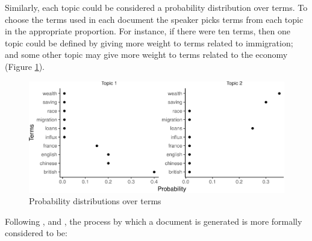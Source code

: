 \documentclass[12pt,]{article}
\theoremstyle{definition}
\theoremstyle{definition}
\theoremstyle{definition}
\theoremstyle{remark}
\begin{document}
Similarly, each topic could be considered a probability distribution
over terms. To choose the terms used in each document the speaker picks
terms from each topic in the appropriate proportion. For instance, if
there were ten terms, then one topic could be defined by giving more
weight to terms related to immigration; and some other topic may give
more weight to terms related to the economy (Figure
\ref{fig:topicsoverterms}).

\begin{figure}
\centering
\includegraphics{svm-rmarkdown-article-example_files/figure-latex/topicsoverterms-1.pdf}
\caption{\label{fig:topicsoverterms}Probability distributions over terms}
\end{figure}

Following \citet{BleiLafferty2009}, \citet{blei2012} and
\citet{GriffithsSteyvers2004}, the process by which a document is
generated is more formally considered to be:
\end{document}
